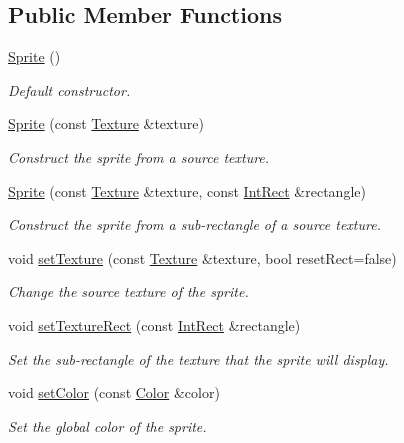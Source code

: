 \subsection*{Public Member Functions}
\begin{DoxyCompactItemize}
\item 
\hyperlink{classsf_1_1Sprite_a92559fbca895a96758abf5eabab96984}{Sprite} ()
\begin{DoxyCompactList}\small\item\em Default constructor. \end{DoxyCompactList}\item 
\hyperlink{classsf_1_1Sprite_a2a9fca374d7abf084bb1c143a879ff4a}{Sprite} (const \hyperlink{classsf_1_1Texture}{Texture} \&texture)
\begin{DoxyCompactList}\small\item\em Construct the sprite from a source texture. \end{DoxyCompactList}\item 
\hyperlink{classsf_1_1Sprite_a01cfe1402372d243dbaa2ffa96020206}{Sprite} (const \hyperlink{classsf_1_1Texture}{Texture} \&texture, const \hyperlink{classsf_1_1Rect}{Int\-Rect} \&rectangle)
\begin{DoxyCompactList}\small\item\em Construct the sprite from a sub-\/rectangle of a source texture. \end{DoxyCompactList}\item 
void \hyperlink{classsf_1_1Sprite_a3729c88d88ac38c19317c18e87242560}{set\-Texture} (const \hyperlink{classsf_1_1Texture}{Texture} \&texture, bool reset\-Rect=false)
\begin{DoxyCompactList}\small\item\em Change the source texture of the sprite. \end{DoxyCompactList}\item 
void \hyperlink{classsf_1_1Sprite_a3fefec419a4e6a90c0fd54c793d82ec2}{set\-Texture\-Rect} (const \hyperlink{classsf_1_1Rect}{Int\-Rect} \&rectangle)
\begin{DoxyCompactList}\small\item\em Set the sub-\/rectangle of the texture that the sprite will display. \end{DoxyCompactList}\item 
void \hyperlink{classsf_1_1Sprite_a14def44da6437bfea20c4df5e71aba4c}{set\-Color} (const \hyperlink{classsf_1_1Color}{Color} \&color)
\begin{DoxyCompactList}\small\item\em Set the global color of the sprite. \end{DoxyCompactList}\item 

\end{DoxyCompactItemize}
